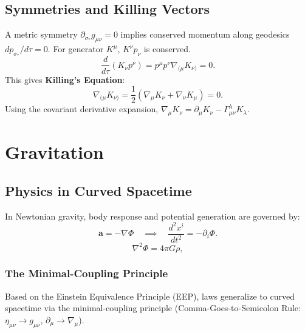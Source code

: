 \documentclass[11pt, a4paper]{report}
\begin{document}
\section{Symmetries and Killing Vectors}
A metric symmetry $\partial_{\sigma_*} g_{\mu\nu} = 0$ implies conserved momentum along geodesics $dp_{\sigma_*}/d\tau = 0$. For generator $K^\mu$, $K^\nu p_\nu$ is conserved.
\begin{equation}
\frac{d}{d\tau} (K_\nu p^\nu) = p^\mu p^\nu \nabla_{(\mu} K_{\nu)} = 0.
\end{equation}
This gives \textbf{Killing's Equation}:
\begin{equation}\label{eq:killing_eq}
\nabla_{(\mu} K_{\nu)} = \frac{1}{2} (\nabla_\mu K_\nu + \nabla_\nu K_\mu) = 0.
\end{equation}
Using the covariant derivative expansion, $\nabla_\mu K_\nu = \partial_\mu K_\nu - \Gamma^\lambda_{\mu\nu} K_\lambda$.



\chapter{Gravitation}

\section{Physics in Curved Spacetime}

In Newtonian gravity, body response and potential generation are governed by:
\begin{equation}
\label{eq:newton_accel}
\mathbf{a} = -\nabla\Phi \quad \implies \quad \frac{d^{2}x^{i}}{dt^{2}} = -\partial_{i}\Phi.
\end{equation}
\begin{equation}
\label{eq:poisson}
\nabla^{2}\Phi = 4\pi G\rho,
\end{equation}

\subsection*{The Minimal-Coupling Principle}
Based on the Einstein Equivalence Principle (EEP), laws generalize to curved spacetime via the minimal-coupling principle (Comma-Goes-to-Semicolon Rule: $\eta_{\mu\nu} \rightarrow g_{\mu\nu}$, $\partial_{\mu} \rightarrow \nabla_{\mu}$).
\end{document}
